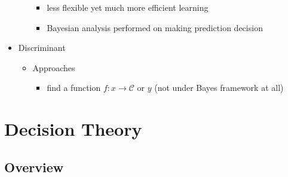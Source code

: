 \begin{itemize}
\begin{itemize}
\begin{itemize}
		\item less flexible yet much more efficient learning
		\item Bayesian analysis performed on making prediction decision
		\end{itemize}
	\end{itemize}
\item Discriminant
	\begin{itemize}
	\item Approaches
		\begin{itemize}
		\item find a function $f:x\rightarrow \mathcal C$ or $y$ (not under Bayes framework at all)
		\end{itemize}
	\end{itemize}
\end{itemize}
\section{Decision Theory}
\subsection{Overview}
